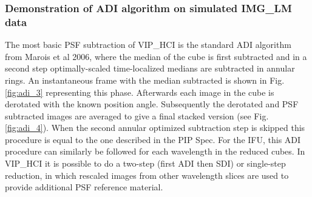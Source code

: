 \subsubsection{Demonstration of ADI algorithm on simulated IMG\_LM data}
The most basic PSF subtraction of VIP\_HCI is the standard ADI algorithm from Marois et al 2006, where the median of the cube is first subtracted and in a second step optimally-scaled time-localized medians are subtracted in annular rings. An instantaneous frame with the median subtracted is shown in Fig. \ref{fig:adi_3} representing this phase. Afterwards each image in the cube is derotated with the known position angle. Subsequently the derotated and PSF subtracted images are averaged to give a final stacked version (see Fig. \ref{fig:adi_4}). When the second annular optimized subtraction step is skipped this procedure is equal to the one described in the PIP Spec.
For the IFU, this ADI procedure can similarly be followed for each wavelength in the reduced cubes. In VIP\_HCI it is possible to do a two-step (first ADI then SDI) or single-step reduction, in which rescaled images from other wavelength slices are used to provide additional PSF reference material.



